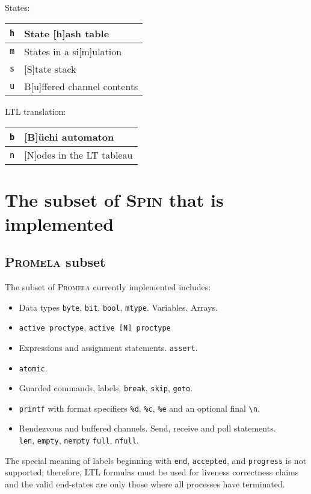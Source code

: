 \documentclass[11pt]{article}
\newcommand*{\spn}{\textsc{Spin}}
\newcommand*{\prm}{\textsc{Promela}}
\newcommand*{\p}[1]{\texttt{#1}}
\begin{document}
States:
\begin{center}
\begin{tabular}{|l|p{}|}
\hline
\p{h} & State [h]ash table\\\hline
\p{m} & States in a si[m]ulation\\\hline
\p{s} & [S]tate stack\\\hline
\p{u} & B[u]ffered channel contents\\\hline
\end{tabular}
\end{center}

LTL translation:
\begin{center}
\begin{tabular}{|l|p{}|}
\hline
\p{b} & [B]\"{u}chi automaton\\\hline
\p{n} & [N]odes in the LT tableau\\\hline
\end{tabular}
\end{center}

\newpage

\section{The subset of \spn{} that is implemented}
\subsection*{\prm{} subset}
The subset of \prm{} currently implemented includes:
\begin{itemize}
\item Data types \p{byte}, \p{bit}, \p{bool}, \p{mtype}. Variables. Arrays.
\item \p{active proctype}, \p{active [N] proctype}
\item Expressions and assignment statements. \p{assert}.
\item \p{atomic}.
\item Guarded commands, labels, \p{break}, \p{skip}, \p{goto}.
\item \p{printf} with format specifiers \p{\%d}, \p{\%c}, \p{\%e} and an
optional final \verb+\n+.
\item Rendezvous and buffered channels. Send, receive and poll
statements.\\\p{len}, \p{empty}, \p{nempty} \p{full}, \p{nfull}.
\end{itemize}

The special meaning of labels beginning with \p{end}, \p{accepted}, and
\p{progress} is not supported; therefore, LTL formulas must be used for
liveness correctness claims and the valid end-states are only those
where all processes have terminated.
\end{document}
